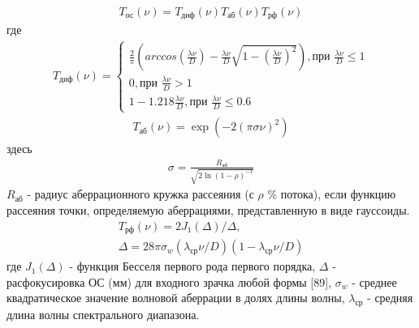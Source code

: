 \begin{equation}
\label{eq:p2:fpm4}
\begin{alignedat}{2}
T_\textit{ос}(\nu)=T_\textit{диф}(\nu) T_\textit{аб}(\nu) T_\textit{рф}(\nu)
\end{alignedat}
\end{equation}
где
\begin{equation}
\label{eq:p2:fpm5}
\begin{alignedat}{2}
T_\textit{диф}(\nu)=
\begin{cases}
\frac{2}{\pi}( arccos(\frac{\lambda \nu}{D}) - \frac{\lambda \nu}{D} \sqrt{1-(\frac{\lambda \nu}{D})^2} ), \textit{при } \frac{\lambda \nu}{D} \leqslant 1 \\
0, \textit{при } \frac{\lambda \nu}{D} > 1 \\
1 - 1.218 \frac{\lambda \nu}{D}, \textit{при } \frac{\lambda \nu}{D} \leqslant 0.6
\end{cases}
\end{alignedat}
\end{equation}
\begin{equation}
\label{eq:p2:fpm6}
\begin{alignedat}{2}
T_\textit{аб}(\nu) = \exp{}(-2(\pi \sigma \nu)^2)
\end{alignedat}
\end{equation}
здесь
\begin{equation}
\label{eq:p2:fpm7}
\begin{alignedat}{2}
\sigma = \frac{R_\textit{аб}}{\sqrt{2 \ln{}(1-\rho)^{-1}}}
\end{alignedat}
\end{equation}
$ R_\textit{аб}$ - радиус аберрационного кружка рассеяния (с $\rho$ \% потока),  если функцию рассеяния точки, определяемую аберрациями, представленную в виде гауссоиды.
\begin{equation}
\label{eq:p2:fpm8}
\begin{alignedat}{2}
T_\textit{рф}(\nu) = 2 J_1 (\Delta)/\Delta,\\
\Delta = 28\pi\sigma_w(\lambda_\textit{ср}\nu/D)(1-\lambda_\textit{ср}\nu/D)
\end{alignedat}
\end{equation}
где
$J_1 (\Delta)$ - функция Бесселя первого рода первого порядка, 
$\Delta$ - расфокусировка ОС (мм)  для входного зрачка любой формы [89], 
$\sigma_w$ - среднее квадратическое значение волновой аберрации в долях длины волны, 
$\lambda_\textit{ср}$ - средняя длина волны спектрального диапазона.

